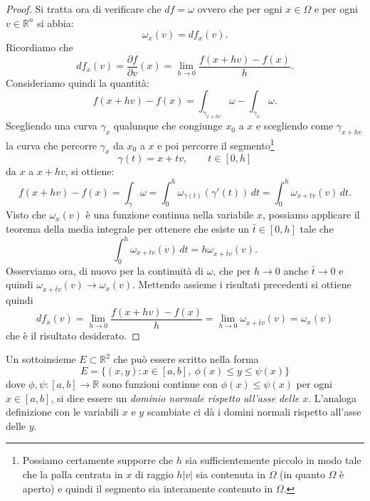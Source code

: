 \documentclass[italian,a4paper]{scrartcl}
\newcommand{\RR}{{\mathbb R}}
\begin{document}
\begin{proof}
Si tratta ora di verificare che $df = \omega$ ovvero che per ogni
$x\in \Omega$ e per ogni $v\in \RR^n$ si abbia:
\[
   \omega_x(v) = df_x(v).
\]
Ricordiamo che 
\[
df_x(v) = \frac{\partial f}{\partial v}(x) = \lim_{h\to 0}
\frac{f(x+hv) - f(x)}{h}.
\]
Consideriamo quindi la quantità:
\[
 f(x+hv)-f(x) = \int_{\gamma_{x+hv}} \omega - \int_{\gamma_x} \omega.
\]
Scegliendo una curva $\gamma_x$ qualunque che congiunge $x_0$ a $x$ e
scegliendo come $\gamma_{x+hv}$ la curva che percorre $\gamma_x$ da
$x_0$ a $x$ e poi percorre il segmento\footnote{Possiamo certamente
  supporre che $h$ sia sufficientemente piccolo in modo tale che la
  palla centrata in $x$ di raggio $h|v|$ sia contenuta in $\Omega$ (in
quanto $\Omega$ è aperto) e quindi il segmento sia interamente
contenuto in $\Omega$.} 
\[
  \gamma(t) = x + t v,\qquad t\in[0,h]
\]
da $x$ a $x+hv$, si ottiene:
\[
f(x+hv)-f(x) = \int_\gamma \omega = \int_0^h
\omega_{\gamma(t)}(\gamma'(t))\, dt
= \int_0^h \omega_{x+tv}(v)\, dt.
\]
Visto che $\omega_x(v)$ è una funzione continua nella variabile $x$,
possiamo applicare il teorema della media integrale per ottenere che
esiste un $\bar t \in [0,h]$ tale che
\[
\int_0^h \omega_{x+tv}(v)\, dt = h \omega_{x+\bar t v}(v).
\]
Osserviamo ora, di nuovo per la continuità di $\omega$, che per $h\to
0$ anche $\bar t \to 0$ e quindi $\omega_{x+\bar t v}(v) \to
\omega_x(v)$.
Mettendo assieme i risultati precedenti si ottiene quindi
\[
df_x(v) = \lim_{h\to 0}\frac{f(x+hv)-f(x)}{h} = \lim_{h\to 0}
\omega_{x+\bar tv}(v) = \omega_x(v)
\]
che è il risultato desiderato.
\end{proof}

Un sottoinsieme $E\subset \RR^2$ che può essere scritto nella forma
\[
  E = \{(x,y)\colon x\in [a,b],\ \phi(x) \le y \le \psi(x)\}
\]
dove $\phi,\psi\colon [a,b]\to \RR$ sono funzioni continue con $\phi(x)\le \psi(x)$ per ogni $x\in [a,b]$,
si dice essere un \emph{dominio normale rispetto all'asse delle
  $x$}. L'analoga definizione con le variabili $x$ e $y$ scambiate
ci dà i domini normali rispetto all'asse delle $y$.
\end{document}
